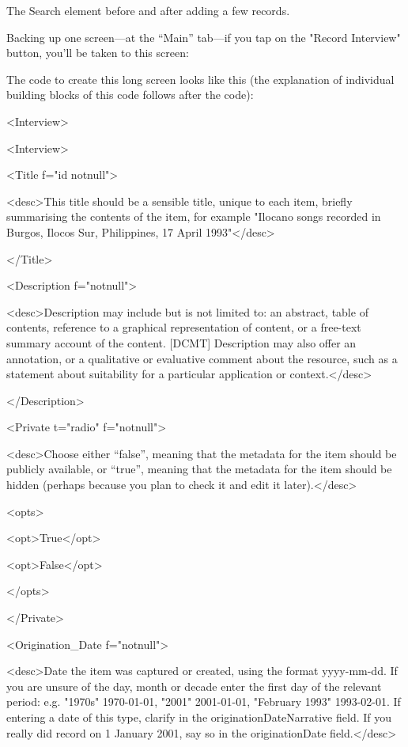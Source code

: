 {}{}

The Search element before and after adding a few records.

Backing up one screen---at the “Main” tab---if you tap on the "Record Interview" button, you'll be taken to this screen:

{}{}{}

The code to create this long screen looks like this (the explanation of individual building blocks of this code follows after the code):

<Interview>

<Interview>

<Title f="id notnull">

<desc>This title should be a sensible title, unique to each item, briefly summarising the contents of the item, for example "Ilocano songs recorded in Burgos, Ilocos Sur, Philippines, 17 April 1993"</desc>

</Title>

<Description f="notnull">

<desc>Description may include but is not limited to: an abstract, table of contents, reference to a graphical representation of content, or a free-text summary account of the content. {[}DCMT{]} Description may also offer an annotation, or a qualitative or evaluative comment about the resource, such as a statement about suitability for a particular application or context.</desc>

</Description>

<Private t="radio" f="notnull">

<desc>Choose either “false”, meaning that the metadata for the item should be publicly available, or “true”, meaning that the metadata for the item should be hidden (perhaps because you plan to check it and edit it later).</desc>

<opts>

<opt>True</opt>

<opt>False</opt>

</opts>

</Private>

<Origination_Date f="notnull">

<desc>Date the item was captured or created, using the format yyyy-mm-dd. If you are unsure of the day, month or decade enter the first day of the relevant period: e.g. "1970s" 1970-01-01, "2001" 2001-01-01, "February 1993" 1993-02-01. If entering a date of this type, clarify in the originationDateNarrative field. If you really did record on 1 January 2001, say so in the originationDate field.</desc>

